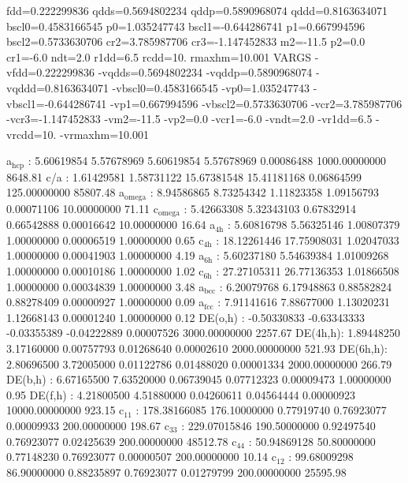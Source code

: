 \documentclass[11pt]{article}
\begin{document}
 fdd=0.222299836 qdds=0.5694802234 qddp=0.5890968074 qddd=0.8163634071 bscl0=0.4583166545 p0=1.035247743 bscl1=-0.644286741 p1=0.667994596 bscl2=0.5733630706 cr2=3.785987706 cr3=-1.147452833 m2=-11.5 p2=0.0 cr1=-6.0 ndt=2.0 r1dd=6.5 rcdd=10. rmaxhm=10.001 
VARGS
    -vfdd=0.222299836 -vqdds=0.5694802234 -vqddp=0.5890968074 -vqddd=0.8163634071 -vbscl0=0.4583166545 -vp0=1.035247743 -vbscl1=-0.644286741 -vp1=0.667994596 -vbscl2=0.5733630706 -vcr2=3.785987706 -vcr3=-1.147452833  -vm2=-11.5 -vp2=0.0 -vcr1=-6.0 -vndt=2.0 -vr1dd=6.5 -vrcdd=10. -vrmaxhm=10.001 


a\(_{\text{hcp}}\)   :   5.60619854   5.57678969   5.60619854   5.57678969   0.00086488 1000.00000000      8648.81
c/a     :   1.61429581   1.58731122  15.67381548  15.41181168   0.06864599 125.00000000     85807.48
a\(_{\text{omega}}\) :   8.94586865   8.73254342   1.11823358   1.09156793   0.00071106  10.00000000        71.11
c\(_{\text{omega}}\) :   5.42663308   5.32343103   0.67832914   0.66542888   0.00016642  10.00000000        16.64
a\(_{\text{4h}}\)    :   5.60816798   5.56325146   1.00807379   1.00000000   0.00006519   1.00000000         0.65
c\(_{\text{4h}}\)    :  18.12261446  17.75908031   1.02047033   1.00000000   0.00041903   1.00000000         4.19
a\(_{\text{6h}}\)    :   5.60237180   5.54639384   1.01009268   1.00000000   0.00010186   1.00000000         1.02
c\(_{\text{6h}}\)    :  27.27105311  26.77136353   1.01866508   1.00000000   0.00034839   1.00000000         3.48
a\(_{\text{bcc}}\)   :   6.20079768   6.17948863   0.88582824   0.88278409   0.00000927   1.00000000         0.09
a\(_{\text{fcc}}\)   :   7.91141616   7.88677000   1.13020231   1.12668143   0.00001240   1.00000000         0.12
DE(o,h) :  -0.50330833  -0.63343333  -0.03355389  -0.04222889   0.00007526 3000.00000000      2257.67
DE(4h,h):   1.89448250   3.17160000   0.00757793   0.01268640   0.00002610 2000.00000000       521.93
DE(6h,h):   2.80696500   3.72005000   0.01122786   0.01488020   0.00001334 2000.00000000       266.79
DE(b,h) :   6.67165500   7.63520000   0.06739045   0.07712323   0.00009473   1.00000000         0.95
DE(f,h) :   4.21800500   4.51880000   0.04260611   0.04564444   0.00000923 10000.00000000       923.15
c\(_{\text{11}}\)    : 178.38166085 176.10000000   0.77919740   0.76923077   0.00009933 200.00000000       198.67
c\(_{\text{33}}\)    : 229.07015846 190.50000000   0.92497540   0.76923077   0.02425639 200.00000000     48512.78
c\(_{\text{44}}\)    :  50.94869128  50.80000000   0.77148230   0.76923077   0.00000507 200.00000000        10.14
c\(_{\text{12}}\)    :  99.68009298  86.90000000   0.88235897   0.76923077   0.01279799 200.00000000     25595.98
\end{document}
